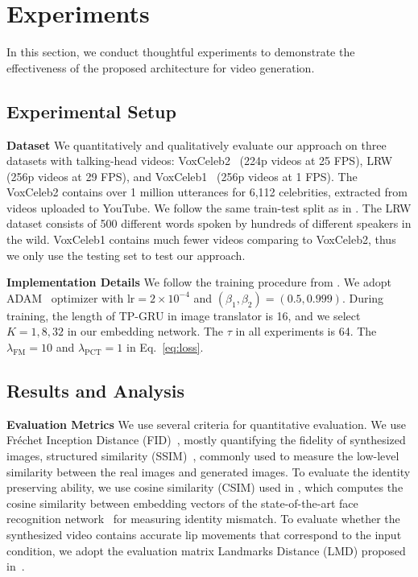 \documentclass[runningheads]{llncs}
\begin{document}
\section{Experiments}
\label{sec:experiments}
In this section, we conduct thoughtful experiments to demonstrate the effectiveness of the proposed architecture for video generation. 

\subsection{Experimental Setup}
\label{subsec:exp_setup}

\noindent \textbf{Dataset} \quad We quantitatively and qualitatively evaluate our approach on three datasets with talking-head videos: VoxCeleb2~\cite{Chung18b} (224p videos at 25 FPS), LRW~\cite{Chung16} (256p videos at 29 FPS), and VoxCeleb1~\cite{Nagrani17} (256p videos at 1 FPS). The VoxCeleb2 contains over 1 million utterances for 6,112 celebrities, extracted from videos uploaded to YouTube. We follow the same train-test split as in \cite{Chung18b}. The LRW dataset consists of 500 different words spoken by hundreds of different speakers in the wild. VoxCeleb1 contains much fewer videos comparing to VoxCeleb2, thus we only use the testing set to test our approach. 

\noindent \textbf{Implementation Details} \quad We follow the training procedure from \cite{chen2019hierarchical}. We adopt ADAM~\cite{KingmaB14} optimizer with $\text{lr} = 2 \times 10^{-4}$ and $(\beta_1,\beta_2) = (0.5,0.999)$. During training, the length of TP-GRU in image translator is 16, and we select $K = 1,8,32$ in our embedding network. The $\tau$ in all experiments is 64. The $\lambda_{\text{FM}} = 10$ and $\lambda_{\text{PCT}} = 1$ in Eq.~\ref{eq:loss}.  
   
\subsection{Results and Analysis}
\label{subsec:quanti_res}
\noindent \textbf{Evaluation Metrics} \quad We use several criteria for quantitative evaluation. We use Fréchet Inception Distance (FID)~\cite{heusel2017gans}, mostly quantifying the fidelity of synthesized images, structured similarity (SSIM)~\cite{wang2004image}, commonly used to measure the low-level similarity between the real images and generated images. To evaluate the identity preserving ability, we use cosine similarity (CSIM) used in \cite{zakharov2019few}, which computes the cosine similarity between embedding vectors of the state-of-the-art face recognition network~\cite{deng2019arcface} for measuring identity mismatch. To evaluate whether the synthesized video contains accurate lip movements that correspond to the input condition, we adopt the evaluation matrix Landmarks Distance (LMD) proposed in~\cite{chen2018lip}.
\end{document}
